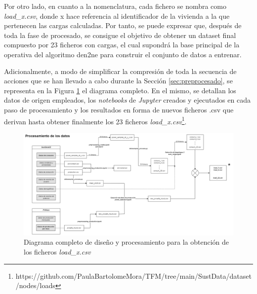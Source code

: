 Por otro lado, en cuanto a la nomenclatura, cada fichero se nombra como \textit{load\_x.csv}, donde x hace referencia al identificador de la vivienda a la que pertenecen las cargas calculadas. Por tanto, se puede expresar que, después de toda la fase de procesado, se consigue el objetivo de obtener un dataset final compuesto por 23 ficheros con cargas, el cual supondrá la base principal de la operativa del algoritmo \gls{den2ne} para construir el conjunto de datos a entrenar.

\vspace{3mm}

Adicionalmente, a modo de simplificar la compresión de toda la secuencia de acciones que se han llevado a cabo durante la Sección \ref{sec:preprocesado}, se representa en la Figura \ref{fig:total1} el diagrama completo. En el mismo, se detallan los datos de origen empleados, los \textit{notebooks} de \textit{Jupyter} creados y ejecutados en cada paso de procesamiento y los resultados en forma de nuevos ficheros .csv que derivan hasta obtener finalmente los 23 ficheros \textit{load\_x.csv}\footnote{https://github.com/PaulaBartolomeMora/TFM/tree/main/SustData/dataset/nodes/loads}.

\vspace{8mm}

\begin{figure}
    \centering
    \includegraphics[width=1\textwidth]{img/diseno/total1.png} 
    \caption{Diagrama completo de diseño y procesamiento para la obtención de los ficheros \textit{load\_x.csv}}
    \label{fig:total1}
\end{figure}


